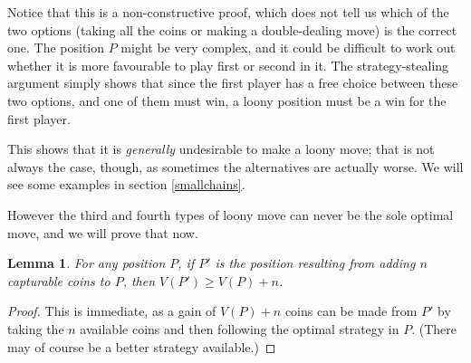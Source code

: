 \documentclass[a4paper,twocolumn]{article}
\newtheorem{addcoins}[thm]{Lemma}
\begin{document}
Notice that this is a non-constructive proof, which does not tell us
which of the two options (taking all the coins or making a
double-dealing move) is the correct one. The position $P$ might be
very complex, and it could be difficult to work out whether it is more
favourable to play first or second in it. The strategy-stealing
argument simply shows that since the first player has a free choice
between these two options, and one of them must win, a loony position
must be a win for the first player.

This shows that it is \emph{generally} undesirable to make a loony
move; that is not always the case, though, as sometimes the
alternatives are actually worse. We will see some examples in section
\ref{smallchains}.

However the third and fourth types of loony move can never be the sole
optimal move, and we will prove that now.

\begin{addcoins}\label{addcoins}
  For any position $P$, if $P'$ is the position resulting from adding
  $n$ capturable coins to $P$, then $V(P') \ge V(P)+n$.
\end{addcoins}
\begin{proof}
  This is immediate, as a gain of $V(P)+n$ coins can be made from $P'$
  by taking the $n$ available coins and then following the optimal
  strategy in $P$. (There may of course be a better strategy
  available.)
\end{proof}
\end{document}
